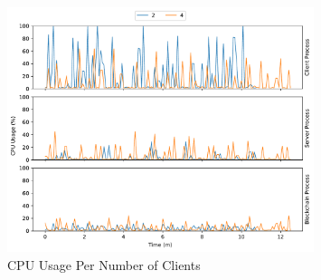 \begin{figure}[!hpb]
    \centering
    \centering
    \includegraphics[width=0.8\textwidth]{graphics/vertical/cpu.pdf}
    \caption{CPU Usage Per Number of Clients}
    \label{fig:cpu_vertical}
\end{figure}